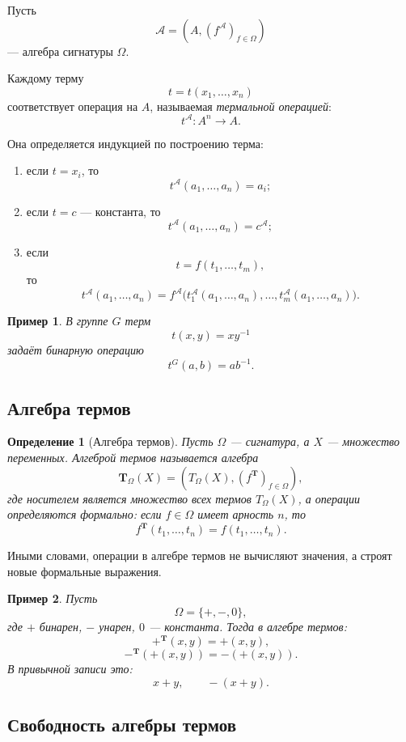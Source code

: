 \documentclass[12pt,a4paper]{article}
\newtheorem{definition}{Определение}
\newtheorem{example}{Пример}
\begin{document}
Пусть
\[
\mathcal A=(A,(f^{\mathcal A})_{f\in\Omega})
\]
--- алгебра сигнатуры $\Omega$.

Каждому терму
\[
t=t(x_1,\dots,x_n)
\]
соответствует операция на $A$, называемая \emph{термальной операцией}:
\[
t^{\mathcal A}\colon A^n\to A.
\]

Она определяется индукцией по построению терма:
\begin{enumerate}
    \item если $t=x_i$, то
    \[
    t^{\mathcal A}(a_1,\dots,a_n)=a_i;
    \]
    \item если $t=c$ --- константа, то
    \[
    t^{\mathcal A}(a_1,\dots,a_n)=c^{\mathcal A};
    \]
    \item если
    \[
    t=f(t_1,\dots,t_m),
    \]
    то
    \[
    t^{\mathcal A}(a_1,\dots,a_n)
    =
    f^{\mathcal A}
    \bigl(
    t_1^{\mathcal A}(a_1,\dots,a_n),
    \dots,
    t_m^{\mathcal A}(a_1,\dots,a_n)
    \bigr).
    \]
\end{enumerate}

\begin{example}
В группе $G$ терм
\[
t(x,y)=xy^{-1}
\]
задаёт бинарную операцию
\[
t^G(a,b)=ab^{-1}.
\]
\end{example}

\subsection{Алгебра термов}

\begin{definition}[Алгебра термов]
Пусть $\Omega$ --- сигнатура, а $X$ --- множество переменных. \emph{Алгеброй термов} называется алгебра
\[
\mathbf T_\Omega(X)
=
(T_\Omega(X),(f^{\mathbf T})_{f\in\Omega}),
\]
где носителем является множество всех термов $T_\Omega(X)$, а операции определяются формально:
если $f\in\Omega$ имеет арность $n$, то
\[
f^{\mathbf T}(t_1,\dots,t_n)=f(t_1,\dots,t_n).
\]
\end{definition}

Иными словами, операции в алгебре термов не вычисляют значения, а строят новые формальные выражения.

\begin{example}
Пусть
\[
\Omega=\{+,-,0\},
\]
где $+$ бинарен, $-$ унарен, $0$ --- константа. Тогда в алгебре термов:
\[
+^{\mathbf T}(x,y)=+(x,y),
\]
\[
-^{\mathbf T}(+(x,y))=-(+(x,y)).
\]
В привычной записи это:
\[
x+y,
\qquad
-(x+y).
\]
\end{example}

\subsection{Свободность алгебры термов}
\end{document}
